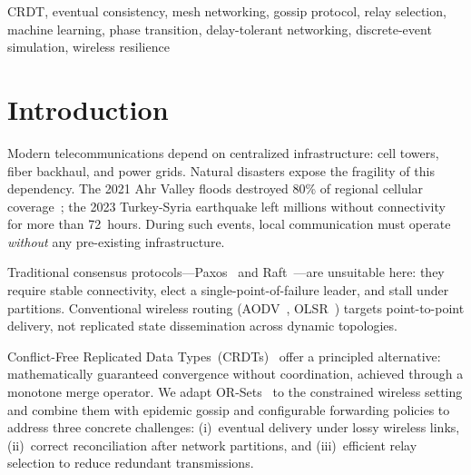 \documentclass[conference]{IEEEtran}
\begin{document}
\begin{IEEEkeywords}
CRDT, eventual consistency, mesh networking, gossip protocol, relay selection,
machine learning, phase transition, delay-tolerant networking,
discrete-event simulation, wireless resilience
\end{IEEEkeywords}

\section{Introduction}

Modern telecommunications depend on centralized infrastructure: cell towers,
fiber backhaul, and power grids.  Natural disasters expose the fragility of this
dependency.  The 2021 Ahr Valley floods destroyed 80\% of regional cellular
coverage~\cite{itu_disaster_2022}; the 2023 Turkey-Syria earthquake left millions
without connectivity for more than 72~hours.  During such events, local
communication must operate \emph{without} any pre-existing infrastructure.

Traditional consensus protocols---Paxos~\cite{lamport_paxos_1998} and
Raft~\cite{ongaro_raft_2014}---are unsuitable here: they require stable
connectivity, elect a single-point-of-failure leader, and stall under partitions.
Conventional wireless routing (AODV~\cite{perkins_aodv_2003},
OLSR~\cite{clausen_olsr_2003}) targets point-to-point delivery, not replicated
state dissemination across dynamic topologies.

Conflict-Free Replicated Data Types~(CRDTs)~\cite{shapiro_crdt_2011} offer a
principled alternative: mathematically guaranteed convergence without coordination,
achieved through a monotone merge operator.  We adapt OR-Sets~\cite{bieniusa_or_2012}
to the constrained wireless setting and combine them with epidemic gossip and
configurable forwarding policies to address three concrete challenges:
(i)~eventual delivery under lossy wireless links,
(ii)~correct reconciliation after network partitions, and
(iii)~efficient relay selection to reduce redundant transmissions.
\end{document}

